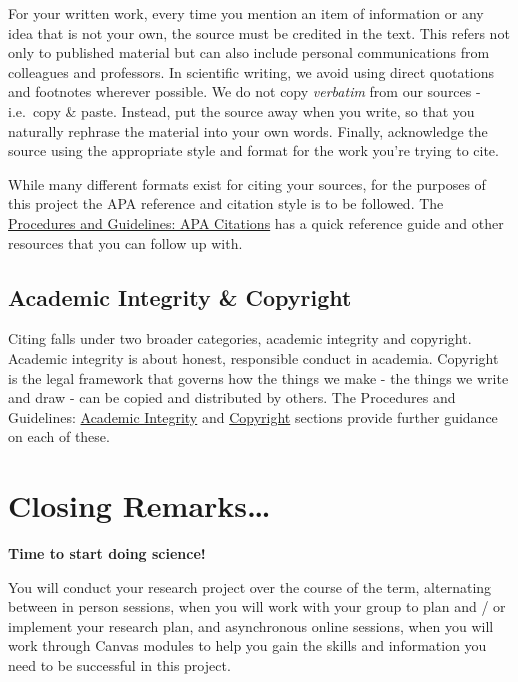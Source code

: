 \documentclass[
]{book}
\begin{document}
For your written work, every time you mention an item of information or any idea that is not your own, the source must be credited in the text. This refers not only to published material but can also include personal communications from colleagues and professors. In scientific writing, we avoid using direct quotations and footnotes wherever possible. We do not copy \emph{verbatim} from our sources - i.e.~copy \& paste. Instead, put the source away when you write, so that you naturally rephrase the material into your own words. Finally, acknowledge the source using the appropriate style and format for the work you're trying to cite.

While many different formats exist for citing your sources, for the purposes of this project the APA reference and citation style is to be followed. The \href{https://ubco-biology.github.io/Procedures-and-Guidelines/apa-citations.html}{Procedures and Guidelines: APA Citations} has a quick reference guide and other resources that you can follow up with.

\hypertarget{academic-integrity-copyright}{%
\subsection*{Academic Integrity \& Copyright}\label{academic-integrity-copyright}}

Citing falls under two broader categories, academic integrity and copyright. Academic integrity is about honest, responsible conduct in academia. Copyright is the legal framework that governs how the things we make - the things we write and draw - can be copied and distributed by others. The Procedures and Guidelines: \href{https://ubco-biology.github.io/Procedures-and-Guidelines/academic-integrity.html}{Academic Integrity} and \href{https://ubco-biology.github.io/Procedures-and-Guidelines/copyright-1.html}{Copyright} sections provide further guidance on each of these.

\hypertarget{closing-remarks}{%
\section*{Closing Remarks\ldots{}}\label{closing-remarks}}

\textbf{Time to start doing science!}

You will conduct your research project over the course of the term, alternating between in person sessions, when you will work with your group to plan and / or implement your research plan, and asynchronous online sessions, when you will work through Canvas modules to help you gain the skills and information you need to be successful in this project.
\end{document}
